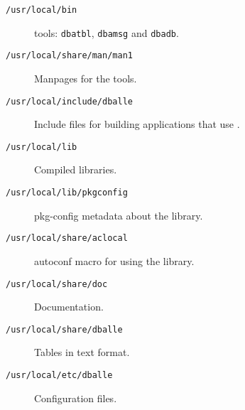 \begin{description}
\item[{\tt /usr/local/bin}]
	\dballe{} tools: {\tt dbatbl}, {\tt dbamsg} and {\tt dbadb}.
\item[{\tt /usr/local/share/man/man1}]
	Manpages for the \dballe{} tools.
\item[{\tt /usr/local/include/dballe}]
	Include files for building applications that use \dballe{}.
\item[{\tt /usr/local/lib}]
	Compiled libraries.
\item[{\tt /usr/local/lib/pkgconfig}]
	pkg-config metadata about the library.
\item[{\tt /usr/local/share/aclocal}]
	autoconf macro for using the library.
\item[{\tt /usr/local/share/doc}]
	Documentation.
\item[{\tt /usr/local/share/dballe}]
	Tables in text format.
\item[{\tt /usr/local/etc/dballe}]
	Configuration files.
\end{description}
